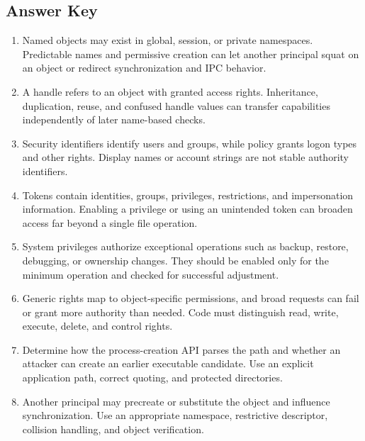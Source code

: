 \documentclass[11pt,letterpaper]{article}
\begin{document}
\subsection*{Answer Key}
\begin{enumerate}
\item Named objects may exist in global, session, or private namespaces. Predictable names and permissive creation can let another principal squat on an object or redirect synchronization and IPC behavior.
\item A handle refers to an object with granted access rights. Inheritance, duplication, reuse, and confused handle values can transfer capabilities independently of later name-based checks.
\item Security identifiers identify users and groups, while policy grants logon types and other rights. Display names or account strings are not stable authority identifiers.
\item Tokens contain identities, groups, privileges, restrictions, and impersonation information. Enabling a privilege or using an unintended token can broaden access far beyond a single file operation.
\item System privileges authorize exceptional operations such as backup, restore, debugging, or ownership changes. They should be enabled only for the minimum operation and checked for successful adjustment.
\item Generic rights map to object-specific permissions, and broad requests can fail or grant more authority than needed. Code must distinguish read, write, execute, delete, and control rights.
\item Determine how the process-creation API parses the path and whether an attacker can create an earlier executable candidate. Use an explicit application path, correct quoting, and protected directories.
\item Another principal may precreate or substitute the object and influence synchronization. Use an appropriate namespace, restrictive descriptor, collision handling, and object verification.
\end{enumerate}
\end{document}
